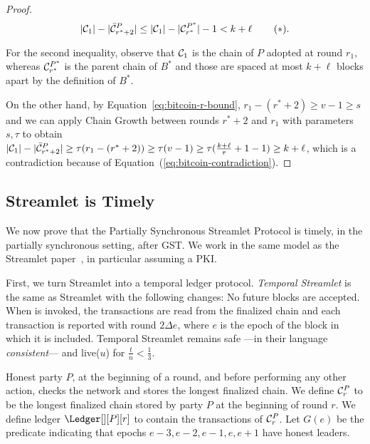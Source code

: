 \begin{proof}

  \[
     |\mathcal{C}_1| - |\bar {\mathcal{C}}^P_{r^* + 2}| \leq
     |\mathcal{C}_1| - |\mathcal{C}^{P^*}_{r^*}| - 1 <
     k + \ell\, \label{eq:bitcoin-contradiction}\tag{$\ast$}.
  \]

  For the second inequality, observe that
  $\mathcal{C}_1$ is the chain of $P$ adopted at round $r_1$,
  whereas $\mathcal{C}^{P^*}_{r^*}$ is
  the parent chain of $B^*$ and those are spaced at most $k + \ell$ blocks
  apart by the definition of $B^*$.

  On the other hand, by Equation~\ref{eq:bitcoin-r-bound}, $r_1 - (r^* + 2) \geq v - 1 \geq s$ and
  we can apply Chain Growth between rounds $r^* + 2$ and $r_1$
  with parameters $s, \tau$ to obtain
  $|\mathcal{C}_1| - |\bar {\mathcal{C}}^P_{r^* + 2}| \geq \tau(r_1 - (r^* + 2)) \geq \tau (v - 1) \geq
  \tau (\frac{k + \ell}{\tau} + 1 - 1) \geq k + \ell$,
  which is a contradiction because of Equation~(\ref{eq:bitcoin-contradiction}).

  \Qed
\end{proof}

\subsection{Streamlet is Timely}

We now prove that the Partially Synchronous Streamlet Protocol is timely,
in the partially synchronous setting, after GST.
We work in the same model as the Streamlet paper~\cite{streamlet},
in particular assuming a PKI.

First, we turn Streamlet into a temporal ledger protocol.
\emph{Temporal Streamlet} is the same as Streamlet with the
following changes: No future blocks are accepted. When \rread is invoked,
the transactions are
read from the finalized chain and each transaction is reported with round $2\Delta e$,
where $e$ is the epoch of the block in which it is included.
Temporal Streamlet remains safe ---in their language \emph{consistent}--- and live($u$)
for $\frac{t}{n} < \frac{1}{3}$.

Honest party $P$, at the beginning of a round, and
before performing any other action, checks the network and
stores the longest finalized chain.
We define $\mathcal{C}^P_r$ to be the longest finalized chain stored by party $P$
at the beginning of round $r$.
We define ledger $\Ledger[][P][r]$ to contain the transactions of $\mathcal{C}^P_r$.
Let $G(e)$ be the predicate indicating that epochs $e-3,e-2,e-1,e,e+1$ have honest leaders.

